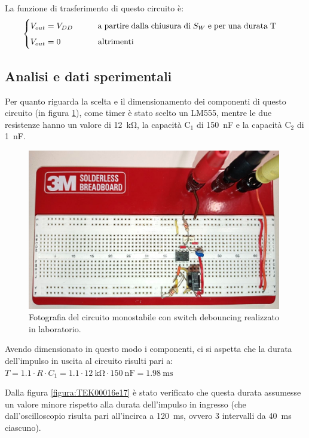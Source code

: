 \documentclass{report}
\begin{document}
\noindent La funzione di trasferimento di questo circuito è:
\begin{equation}
	\begin{cases}
		V_{out}= V_{DD}\indent\indent \mathrm{a\;partire\;dalla\;chiusura\;di\;} S_W \mathrm{\;e\;per\;una\;durata\;T\;}\\[5pt]
		V_{out}= 0\indent\indent\indent \mathrm{altrimenti}\\
	\end{cases}
\end{equation}

\subsection{Analisi e dati sperimentali}
Per quanto riguarda la scelta e il dimensionamento dei componenti di questo circuito (in figura \ref{figura:circuito1}), come timer è stato scelto un LM555, mentre le due resistenze hanno un valore di \SI{12}{\kilo\ohm}, la capacità $\mathrm{C_1}$ di \SI{150}{\nano\farad} e la capacità $\mathrm{C_2}$ di \SI{1}{\nano\farad}.

\begin{figure}[h!]
	\centering
	\includegraphics[height=7cm]{immagini/circuito1}
	\caption{Fotografia del circuito monostabile con switch debouncing realizzato in laboratorio.}
	\label{figura:circuito1}
\end{figure}

Avendo dimensionato in questo modo i componenti, ci si aspetta che la durata dell'impulso in uscita al circuito risulti pari a: \indent$\displaystyle{T = 1.1 \cdot R \cdot C_1 = 1.1 \cdot \SI{12}{\kilo\ohm} \cdot \SI{150}{\nano\farad} = \SI{1.98}{\milli\second}}$

Dalla figura \ref{figura:TEK00016e17} è stato verificato che questa durata assumesse un valore minore rispetto alla durata dell'impulso in ingresso (che dall'oscilloscopio risulta pari all'incirca a \SI{120}{\milli\second}, ovvero 3 intervalli da \SI{40}{\milli\second} ciascuno).
\end{document}
